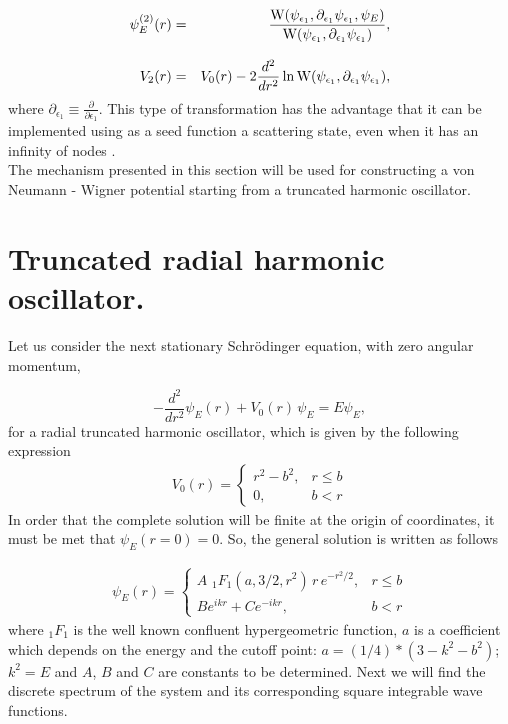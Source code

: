 \documentclass[a4paper]{jpconf}
\begin{document}
\begin{eqnarray}
 \psi_E^{(2)}(r)&=&\frac{{\rm W}(\psi_{\epsilon_1},\partial_{\epsilon_1}\psi_{\epsilon_1},\psi_E)}{{\rm W}(\psi_{\epsilon_1},\partial_{\epsilon_1}\psi_{\epsilon_1})},\label{vNW-dPsi2}\\[0.3cm]
V_2(r)&=&V_0(r)-2\frac{d^2}{dr^2}\ln{{\rm W}(\psi_{\epsilon_1},\partial_{\epsilon_1}\psi_{\epsilon_1})},\label{vNW-dV2}
\end{eqnarray}
where $\partial_{\epsilon_1}\equiv\frac{\partial}{\partial\epsilon_1}$. This type of transformation has the advantage that it can be implemented using as a seed function a scattering state, even when it has an infinity of nodes \cite{Mondragon,Nico1,Nico2,Nico5}.\\
The mechanism presented in this section will be used for constructing a von Neumann - Wigner potential starting from a truncated harmonic oscillator.

\section{Truncated radial harmonic oscillator.}

Let us consider the next stationary Schr\" odinger equation, with zero angular momentum, 

\begin{equation}
-\frac{d^2}{dr^2}\psi_E(r)+V_0(r)\, \psi_E=E\psi_E,\label{TRHO-Schro}
\end{equation}
for a radial truncated harmonic oscillator, which is given by the following expression 
\begin{eqnarray}
V_0(r)=\left\{
\begin{array}{cc}
r^2-b^2,  & r\leq b  \\
  0,&b<r   \label{TRHO-V}
\end{array}
\right.
\end{eqnarray}
In order that the complete solution will be finite at the origin of coordinates, it must be met that $\psi_E(r=0)=0$. So, the general solution is written as follows

\begin{eqnarray}
\psi_E(r)=\left\{
\begin{array}{cc}
A \,\, _1F_1(a,3/2,r^2)\, r\, e^{-r^2/2}, & r\leq b  \\[0.2cm]
  B e^{ikr}+C e^{-ikr},&b<r   \label{TRHO-Psi0}
\end{array}
\right.
\end{eqnarray}
where $_1F_1$ is the well known confluent hypergeometric function, $a$ is a coefficient which depends on the energy and the cutoff point: $a=(1/4)*(3-k^2-b^2)$; $k^2=E$ and $A$, $B$ and $C$ are constants to be determined. Next we will find the discrete spectrum of the system and its corresponding square integrable wave functions.
\end{document}
